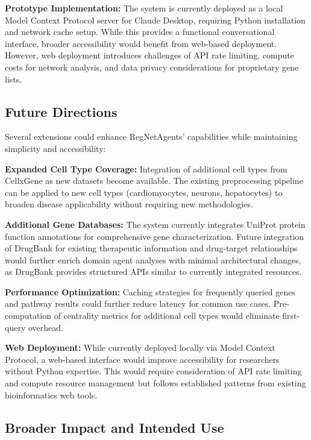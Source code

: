 \documentclass[11pt]{article}
\begin{document}
\textbf{Prototype Implementation:} The system is currently deployed as a local Model Context Protocol server for Claude Desktop, requiring Python installation and network cache setup. While this provides a functional conversational interface, broader accessibility would benefit from web-based deployment. However, web deployment introduces challenges of API rate limiting, compute costs for network analysis, and data privacy considerations for proprietary gene lists.

\subsection{Future Directions}

Several extensions could enhance RegNetAgents' capabilities while maintaining simplicity and accessibility:

\textbf{Expanded Cell Type Coverage:} Integration of additional cell types from CellxGene as new datasets become available. The existing preprocessing pipeline can be applied to new cell types (cardiomyocytes, neurons, hepatocytes) to broaden disease applicability without requiring new methodologies.

\textbf{Additional Gene Databases:} The system currently integrates UniProt protein function annotations for comprehensive gene characterization. Future integration of DrugBank for existing therapeutic information and drug-target relationships would further enrich domain agent analyses with minimal architectural changes, as DrugBank provides structured APIs similar to currently integrated resources.

\textbf{Performance Optimization:} Caching strategies for frequently queried genes and pathway results could further reduce latency for common use cases. Pre-computation of centrality metrics for additional cell types would eliminate first-query overhead.

\textbf{Web Deployment:} While currently deployed locally via Model Context Protocol, a web-based interface would improve accessibility for researchers without Python expertise. This would require consideration of API rate limiting and compute resource management but follows established patterns from existing bioinformatics web tools.

\subsection{Broader Impact and Intended Use}
\end{document}
